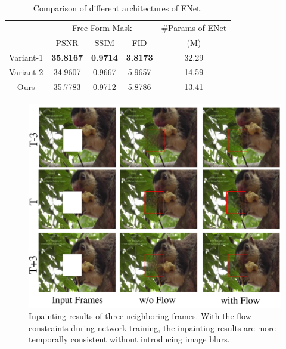 \begin{table}[t]
	\caption{Comparison of different architectures of ENet. }\smallskip
	\scriptsize
	\centering
	{
		\smallskip\begin{tabular}{c|c|c|c|c}
			\hline
			&\multicolumn{3}{c|}{Free-Form Mask}& \#Params of ENet \\
			\cline{2-4} 
			& PSNR & SSIM & FID  & (M) \\
			
			\hline
			Variant-1  &\textbf{35.8167} &\textbf{0.9714} & \textbf{3.8173}& 32.29 \\ \hline
			Variant-2 & 34.9607& 0.9667& 5.9657& 14.59
			\\ \hline
			Ours
			&\underline{35.7783}  &\underline{0.9712}  &   \underline{5.8786}  & 13.41 \\
			\hline
			
			
		\end{tabular}
	}
	\label{tab:com-enet-arch}
\end{table}

\begin{figure}[t]
	\centering
	\includegraphics[width=0.9\columnwidth]{flow_vis} %
	\caption{Inpainting results of three neighboring frames. With the flow constraints during network training, the inpainting results are more temporally consistent without introducing image blurs. }
	\label{flow_vis}
\end{figure}







